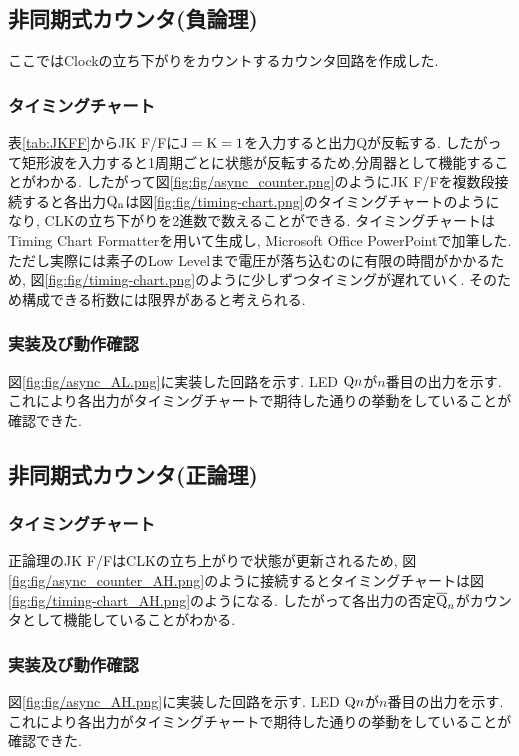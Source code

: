 \subsection{非同期式カウンタ(負論理)}
ここではClockの立ち下がりをカウントするカウンタ回路を作成した.
\subsubsection{タイミングチャート}
表\ref{tab:JKFF}からJK F/Fに$\rm J=K=1$を入力すると出力Qが反転する.
したがって矩形波を入力すると1周期ごとに状態が反転するため,分周器として機能することがわかる.
したがって図\ref{fig:fig/async_counter.png}のようにJK F/Fを複数段接続すると各出力$\rm Q_n$は図\ref{fig:fig/timing-chart.png}のタイミングチャートのようになり,
CLKの立ち下がりを2進数で数えることができる.
タイミングチャートはTiming Chart Formatter\cite{TimingCh73}を用いて生成し,
Microsoft Office PowerPointで加筆した.
ただし実際には素子のLow Levelまで電圧が落ち込むのに有限の時間がかかるため,
図\ref{fig:fig/timing-chart.png}のように少しずつタイミングが遅れていく.
そのため構成できる桁数には限界があると考えられる.
\clearpage
\subsubsection{実装及び動作確認}
図\ref{fig:fig/async_AL.png}に実装した回路を示す.
LED ${\rm Q}n$が$n$番目の出力を示す.
これにより各出力がタイミングチャートで期待した通りの挙動をしていることが確認できた.
\clearpage
\subsection{非同期式カウンタ(正論理)}
\subsubsection{タイミングチャート}
正論理のJK F/FはCLKの立ち上がりで状態が更新されるため,
図\ref{fig:fig/async_counter_AH.png}のように接続するとタイミングチャートは図\ref{fig:fig/timing-chart_AH.png}のようになる.
したがって各出力の否定${\rm\overline{Q}}_n$がカウンタとして機能していることがわかる.
\clearpage
\subsubsection{実装及び動作確認}
図\ref{fig:fig/async_AH.png}に実装した回路を示す.
LED ${\rm Q}n$が$n$番目の出力を示す.
これにより各出力がタイミングチャートで期待した通りの挙動をしていることが確認できた.
